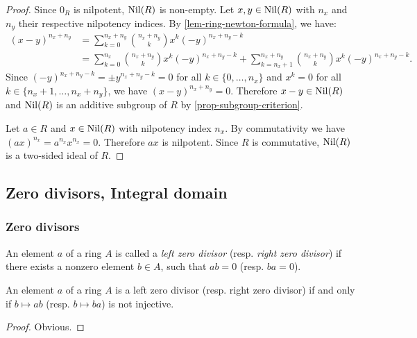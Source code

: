 \documentclass[12pt]{report}
\begin{document}
\begin{proof}
    Since $0_R$ is nilpotent, $\operatorname{Nil} (R)$ is non-empty. Let $x, y \in \operatorname{Nil} (R)$ with $n_x$ and $n_y$ their respective nilpotency indices. By \ref{lem-ring-newton-formula}, we have:
    \[
        \begin{aligned}
            (x - y)^{n_x + n_y} &= \sum\limits_{k = 0}^{n_x + n_y} \binom{n_x + n_y}{k} x^k (-y)^{n_x + n_y - k} \\
                &= \sum\limits_{k = 0}^{n_x} \binom{n_x + n_y}{k} x^k (-y)^{n_x + n_y - k} + \sum\limits_{k = n_x + 1}^{n_x + n_y} \binom{n_x + n_y}{k} x^k (-y)^{n_x + n_y - k}.
        \end{aligned}
    \]
    Since $(-y)^{n_x + n_y - k} = \pm y^{n_x + n_y - k} = 0$ for all $k \in \lbrace 0, \dots, n_x \rbrace$ and $x^k = 0$ for all $k \in \lbrace n_x + 1, \dots, n_x + n_y \rbrace$, we have $(x - y)^{n_x + n_y} = 0$. Therefore $x - y \in \operatorname{Nil} (R)$ and $\operatorname{Nil} (R)$ is an additive subgroup of $R$ by \ref{prop-subgroup-criterion}.

    Let $a \in R$ and $x \in \operatorname{Nil} (R)$ with nilpotency index $n_x$. By commutativity we have $(ax)^{n_x} = a^{n_x} x^{n_x} = 0$. Therefore $ax$ is nilpotent. Since $R$ is commutative, $\operatorname{Nil} (R)$ is a two-sided ideal of $R$.
\end{proof}

\subsection{Zero divisors, Integral domain}
\subsubsection{Zero divisors}

\begin{definition} \label{def-ring-lr-zero-div}
    An element $a$ of a ring $A$ is called a \emph{left zero divisor} (resp. \emph{right zero divisor}) if there exists a nonzero element $b \in A$, such that $ab = 0$ (resp. $ba = 0$).
\end{definition}

\begin{proposition} \label{prop-ring-lr-zero-div-eq}
    An element $a$ of a ring $A$ is a left zero divisor (resp. right zero divisor) if and only if $b \mapsto ab$ (resp. $b \mapsto ba$) is not injective.
\end{proposition}

\begin{proof}
    Obvious.
\end{proof}
\end{document}
